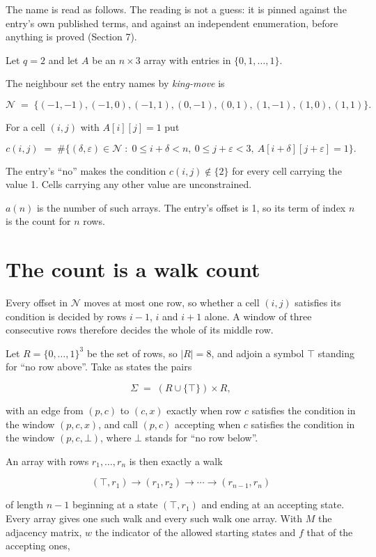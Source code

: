 \documentclass[11pt]{article}
\theoremstyle{definition}
\begin{document}
The name is read as follows. The reading is not a guess: it is pinned against the entry's own published terms, and against an independent enumeration, before anything is proved (Section 7).

Let $q = 2$ and let $A$ be an $n \times 3$ array with entries in $\{0,1,\dots,1\}$.

The neighbour set the entry names by {\itshape king-move} is

\[\mathcal{N} \;=\; \{(-1,-1), (-1,0), (-1,1), (0,-1), (0,1), (1,-1), (1,0), (1,1)\}.\]

For a cell $(i,j)$ with $A[i][j] = 1$ put

\[c(i,j) \;=\; \#\bigl\{(\delta,\varepsilon)\in\mathcal{N} \;:\; 0\le i+\delta<n,\ 0\le j+\varepsilon<3,\ A[i+\delta][j+\varepsilon] = 1\bigr\}.\]

The entry's ``no'' makes the condition $c(i,j) \notin \{2\}$ for every cell carrying the value 1. Cells carrying any other value are unconstrained.

$a(n)$ is the number of such arrays. The entry's offset is 1, so its term of index $n$ is the count for $n$ rows.

\section{The count is a walk count}

Every offset in $\mathcal{N}$ moves at most one row, so whether a cell $(i,j)$ satisfies its condition is decided by rows $i-1$, $i$ and $i+1$ alone. A window of three consecutive rows therefore decides the whole of its middle row.

Let $R = \{0,\dots,1\}^{3}$ be the set of rows, so $|R| = 8$, and adjoin a symbol $\top$ standing for ``no row above''. Take as states the pairs

\[\Sigma \;=\; (R \cup \{\top\}) \times R,\]

with an edge from $(p,c)$ to $(c,x)$ exactly when row $c$ satisfies the condition in the window $(p,c,x)$, and call $(p,c)$ accepting when $c$ satisfies the condition in the window $(p,c,\bot)$, where $\bot$ stands for ``no row below''.

An array with rows $r_1,\dots,r_n$ is then exactly a walk

\[(\top,r_1) \to (r_1,r_2) \to \cdots \to (r_{n-1},r_n)\]

of length $n-1$ beginning at a state $(\top,r_1)$ and ending at an accepting state. Every array gives one such walk and every such walk one array. With $M$ the adjacency matrix, $w$ the indicator of the allowed starting states and $f$ that of the accepting ones,
\end{document}
